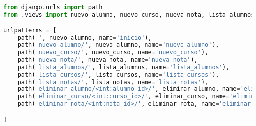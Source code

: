\documentclass{article}
\begin{document}
        \begin{lstlisting}[language=Python, caption=urls.py]
from django.urls import path
from .views import nuevo_alumno, nuevo_curso, nueva_nota, lista_alumnos, lista_cursos, lista_notas,eliminar_alumno, eliminar_curso, eliminar_nota

urlpatterns = [
    path('', nuevo_alumno, name='inicio'),
    path('nuevo_alumno/', nuevo_alumno, name='nuevo_alumno'),
    path('nuevo_curso/', nuevo_curso, name='nuevo_curso'),
    path('nueva_nota/', nueva_nota, name='nueva_nota'),
    path('lista_alumnos/', lista_alumnos, name='lista_alumnos'),
    path('lista_cursos/', lista_cursos, name='lista_cursos'),
    path('lista_notas/', lista_notas, name='lista_notas'),
    path('eliminar_alumno/<int:alumno_id>/', eliminar_alumno, name='eliminar_alumno'),
    path('eliminar_curso/<int:curso_id>/', eliminar_curso, name='eliminar_curso'),
    path('eliminar_nota/<int:nota_id>/', eliminar_nota, name='eliminar_nota'),

]   
        \end{lstlisting}  
\end{document}
